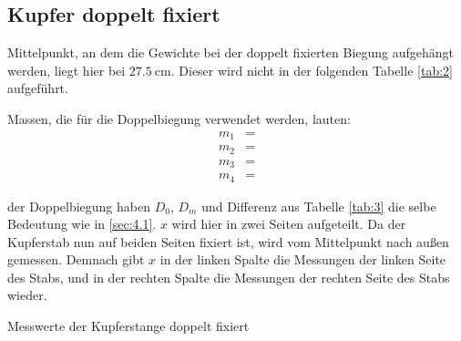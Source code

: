 
\subsection{Kupfer doppelt fixiert}\label{sec:4.2}

\justifying Mittelpunkt, an dem die Gewichte bei der doppelt fixierten Biegung aufgehängt werden, liegt hier bei 
$\SI{27.5}{\centi\meter}$. Dieser wird nicht in der folgenden Tabelle \ref{tab:2} aufgeführt.

\justifying Massen, die für die Doppelbiegung verwendet werden, lauten:
\begin{subequations}\label{eq:15}
\begin{align}
    m_1 &= \text{} \label{eq:15a}\\
    m_2 &= \text{} \label{eq:15b}\\
    m_3 &= \text{} \label{eq:15c}\\
    m_4 &= \text{} \label{eq:15d}
\end{align}
\end{subequations}

\justifying der Doppelbiegung haben $D_0$, $D_m$ und Differenz aus Tabelle \ref{tab:3} die selbe Bedeutung wie in \ref{sec:4.1}.
$x$ wird hier in zwei Seiten aufgeteilt. Da der Kupferstab nun auf beiden Seiten fixiert ist, wird vom Mittelpunkt nach außen gemessen. Demnach
gibt $x$ in der linken Spalte die Messungen der linken Seite des Stabs, und in der rechten Spalte die Messungen der rechten Seite des Stabs wieder.
\begin{table}[H]
    \centering
    
    \caption{Messwerte der Kupferstange doppelt fixiert}
    \label{tab:3}
\end{table}

